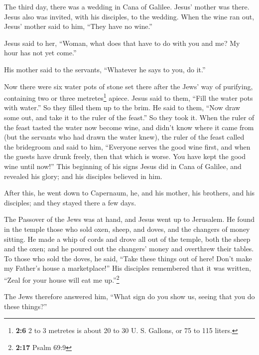  The third day, there was a wedding in Cana of Galilee.
Jesus' mother was there.  Jesus also was invited, with his
disciples, to the wedding.  When the wine ran out, Jesus'
mother said to him, ``They have no wine.''

 Jesus said to her, ``Woman, what does that have to do
with you and me? My hour has not yet come.''

 His mother said to the servants, ``Whatever he says to
you, do it.''

 Now there were six water pots of stone set there after
the Jews' way of purifying, containing two or three metretes\footnote{\textbf{2:6}
  2 to 3 metretes is about 20 to 30 U. S. Gallons, or 75 to 115 liters.}
apiece.  Jesus said to them, ``Fill the water pots with
water.'' So they filled them up to the brim.  He said to
them, ``Now draw some out, and take it to the ruler of the feast.'' So
they took it.  When the ruler of the feast tasted the
water now become wine, and didn't know where it came from (but the
servants who had drawn the water knew), the ruler of the feast called
the bridegroom  and said to him, ``Everyone serves the
good wine first, and when the guests have drunk freely, then that which
is worse. You have kept the good wine until now!''  This
beginning of his signs Jesus did in Cana of Galilee, and revealed his
glory; and his disciples believed in him.

 After this, he went down to Capernaum, he, and his
mother, his brothers, and his disciples; and they stayed there a few
days.

 The Passover of the Jews was at hand, and Jesus went up
to Jerusalem.  He found in the temple those who sold
oxen, sheep, and doves, and the changers of money sitting.
 He made a whip of cords and drove all out of the temple,
both the sheep and the oxen; and he poured out the changers' money and
overthrew their tables.  To those who sold the doves, he
said, ``Take these things out of here! Don't make my Father's house a
marketplace!''  His disciples remembered that it was
written, ``Zeal for your house will eat me up.''\footnote{\textbf{2:17}
  Psalm 69:9}

 The Jews therefore answered him, ``What sign do you show
us, seeing that you do these things?''

